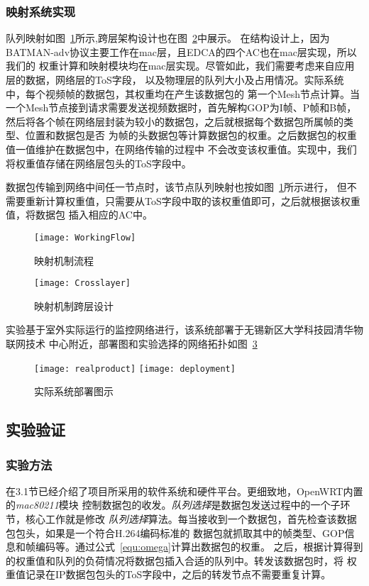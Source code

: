 \subsubsection{映射系统实现}
队列映射如图~\ref{fig:workingflow}所示,跨层架构设计也在图~\ref{fig:crosslayer}中展示。
在结构设计上，因为BATMAN-adv协议主要工作在mac层，且EDCA的四个AC也在mac层实现，所以我们的
权重计算和映射模块均在mac层实现。尽管如此，我们需要考虑来自应用层的数据，网络层的ToS字段，
以及物理层的队列大小及占用情况。实际系统中，每个视频帧的数据包，其权重均在产生该数据包的
第一个Mesh节点计算。当一个Mesh节点接到请求需要发送视频数据时，首先解构GOP为I帧、P帧和B帧，
然后将各个帧在网络层封装为较小的数据包，之后就根据每个数据包所属帧的类型、位置和数据包是否
为帧的头数据包等计算数据包的权重。之后数据包的权重值一值维护在数据包中，在网络传输的过程中
不会改变该权重值。实现中，我们将权重值存储在网络层包头的ToS字段中。

数据包传输到网络中间任一节点时，该节点队列映射也按如图~\ref{fig:workingflow}所示进行，
但不需要重新计算权重值，只需要从ToS字段中取的该权重值即可，之后就根据该权重值，将数据包
插入相应的AC中。

\begin{figure}[H] %
  \centering
  \texttt{[image: WorkingFlow]}
  \caption{映射机制流程}
  \label{fig:workingflow}
\end{figure}
\begin{figure}[H] %
  \centering
  \texttt{[image: Crosslayer]}
  \caption{映射机制跨层设计}
  \label{fig:crosslayer}
\end{figure}

实验基于室外实际运行的监控网络进行，该系统部署于无锡新区大学科技园清华物联网技术
中心附近，部署图和实验选择的网络拓扑如图~\ref{fig:realdeploy}
\begin{figure}[h]
  \centering
  \subcaptionbox{}
      {\texttt{[image: realproduct]}}
  \hspace{1em}
  \subcaptionbox{}
    {\texttt{[image: deployment]}}
  \caption{实际系统部署图示}
  \label{fig:realdeploy}
\end{figure}


\subsection{实验验证}
\renewcommand{\thesubsubsection}{\Alph{subsubsection}.}
\subsubsection{实验方法}
在3.1节已经介绍了项目所采用的软件系统和硬件平台。更细致地，OpenWRT内置的\emph{mac80211}模块
控制数据包的收发。\emph{队列选择}是数据包发送过程中的一个子环节，核心工作就是修改\emph{
队列选择}算法。每当接收到一个数据包，首先检查该数据包包头，如果是一个符合H.264编码标准的
数据包就抓取其中的帧类型、GOP信息和帧编码等。通过公式~\ref{equ:omega}计算出数据包的权重。
之后，根据计算得到的权重值和队列的负荷情况将数据包插入合适的队列中。转发该数据包时，将
权重值记录在IP数据包包头的ToS字段中，之后的转发节点不需要重复计算。

